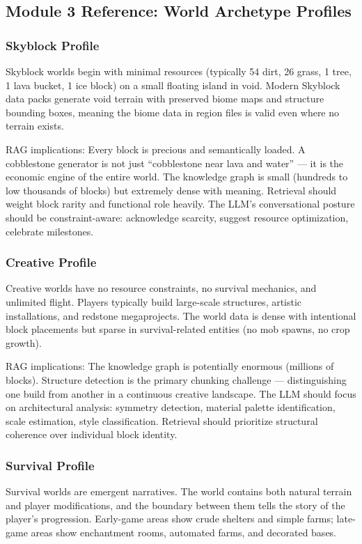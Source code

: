 \documentclass[11pt,letterpaper]{article}
\begin{document}
\subsection{Module 3 Reference: World Archetype Profiles}

\subsubsection{Skyblock Profile}
Skyblock worlds begin with minimal resources (typically 54 dirt, 26 grass, 1 tree, 1 lava bucket, 1 ice block) on a small floating island in void. Modern Skyblock data packs generate void terrain with preserved biome maps and structure bounding boxes, meaning the biome data in region files is valid even where no terrain exists.

RAG implications: Every block is precious and semantically loaded. A cobblestone generator is not just ``cobblestone near lava and water'' --- it is the economic engine of the entire world. The knowledge graph is small (hundreds to low thousands of blocks) but extremely dense with meaning. Retrieval should weight block rarity and functional role heavily. The LLM's conversational posture should be constraint-aware: acknowledge scarcity, suggest resource optimization, celebrate milestones.

\subsubsection{Creative Profile}
Creative worlds have no resource constraints, no survival mechanics, and unlimited flight. Players typically build large-scale structures, artistic installations, and redstone megaprojects. The world data is dense with intentional block placements but sparse in survival-related entities (no mob spawns, no crop growth).

RAG implications: The knowledge graph is potentially enormous (millions of blocks). Structure detection is the primary chunking challenge --- distinguishing one build from another in a continuous creative landscape. The LLM should focus on architectural analysis: symmetry detection, material palette identification, scale estimation, style classification. Retrieval should prioritize structural coherence over individual block identity.

\subsubsection{Survival Profile}
Survival worlds are emergent narratives. The world contains both natural terrain and player modifications, and the boundary between them tells the story of the player's progression. Early-game areas show crude shelters and simple farms; late-game areas show enchantment rooms, automated farms, and decorated bases.
\end{document}
